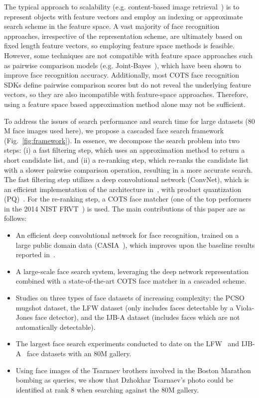 \documentclass[10pt,journal,compsoc]{IEEEtran}
\begin{document}
The typical approach to scalability (e.g. content-based image retrieval~\cite{faceretrieval:wu2010}) is to represent objects with feature vectors and employ an indexing or approximate search scheme in the feature space. A vast majority of face recognition approaches, irrespective of the representation scheme, are ultimately based on fixed length feature vectors, so employing feature space methods is feasible. However, some techniques are not compatible with feature space approaches such as pairwise comparison models (e.g. Joint-Bayes~\cite{ml:jointbayes}), which have been shown to improve face recognition accuracy.  Additionally, most COTS face recognition SDKs define pairwise comparison scores but do not reveal the underlying feature vectors, so they are also incompatible with feature-space approaches. Therefore, using a feature space based approximation method alone may not be sufficient.

To address the issues of search performance and search time for large datasets ($80$M face images used here), we propose a cascaded face search framework (Fig.~\ref{fig:framework}). In essence, we decompose the search problem into two steps: (i) a fast filtering step, which uses an approximation method to return a short candidate list, and (ii) a re-ranking step, which re-ranks the candidate list with a slower pairwise comparison operation, resulting in a more accurate search. The fast filtering step utilizes a deep convolutional network (ConvNet), which is an efficient implementation of the architecture in~\cite{DB:CASIA}, with product quantization (PQ)~\cite{retrieval:pq}. For the re-ranking step, a COTS face matcher (one of the top performers in the 2014 NIST FRVT~\cite{fvrt:2014}) is used. The main contributions of this paper are as follows:
\begin{itemize}
  \item An efficient deep convolutional network for face recognition, trained on a large public domain data (CASIA~\cite{DB:CASIA}), which improves upon the baseline results reported in~\cite{DB:CASIA}.
  \item A large-scale face search system, leveraging the deep network representation combined with a state-of-the-art COTS face matcher in a cascaded scheme.
  \item Studies on three types of face datasets of increasing complexity: the PCSO mugshot dataset, the LFW dataset (only includes faces detectable by a Viola-Jones face detector), and the IJB-A dataset (includes faces which are not automatically detectable).
  \item The largest face search experiments conducted to date on the LFW~\cite{DB:LFWTech} and IJB-A~\cite{db:janus} face datasets with an $80$M gallery.
  \item Using face images of the Tsarnaev brothers involved in the Boston Marathon bombing as queries, we show that Dzhokhar Tsarnaev's photo could be identified at rank $8$ when searching against the $80$M gallery.
\end{itemize}
\end{document}
